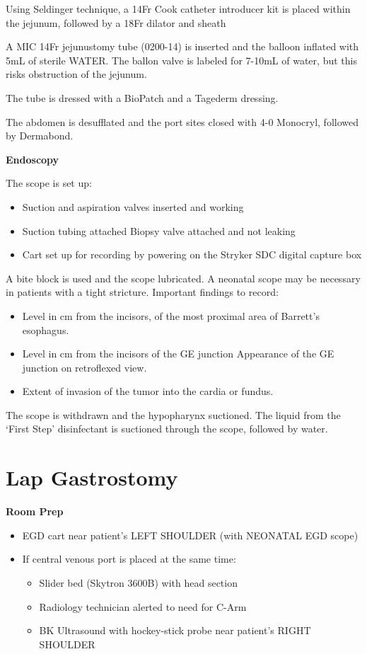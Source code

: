 \documentclass[
  letterpaper,
]{scrbook}
\providecommand{\tightlist}{%
  \setlength{\itemsep}{0pt}\setlength{\parskip}{0pt}}
\begin{document}
Using Seldinger technique, a 14Fr Cook catheter introducer kit is placed
within the jejunum, followed by a 18Fr dilator and sheath

A MIC 14Fr jejunustomy tube (0200-14) is inserted and the balloon
inflated with 5mL of sterile WATER. The ballon valve is labeled for
7-10mL of water, but this risks obstruction of the jejunum.

The tube is dressed with a BioPatch and a Tagederm dressing.

The abdomen is desufflated and the port sites closed with 4-0 Monocryl,
followed by Dermabond.

\textbf{Endoscopy}

The scope is set up:

\begin{itemize}
\tightlist
\item
  Suction and aspiration valves inserted and working
\item
  Suction tubing attached Biopsy valve attached and not leaking
\item
  Cart set up for recording by powering on the Stryker SDC digital
  capture box
\end{itemize}

A bite block is used and the scope lubricated. A neonatal scope may be
necessary in patients with a tight stricture. Important findings to
record:

\begin{itemize}
\tightlist
\item
  Level in cm from the incisors, of the most proximal area of Barrett's
  esophagus.
\item
  Level in cm from the incisors of the GE junction Appearance of the GE
  junction on retroflexed view.
\item
  Extent of invasion of the tumor into the cardia or fundus.
\end{itemize}

The scope is withdrawn and the hypopharynx suctioned. The liquid from
the `First Step' disinfectant is suctioned through the scope, followed
by water.

\chapter{Lap Gastrostomy}\label{lap_gastrostomy_salo}

\textbf{Room Prep}

\begin{itemize}
\tightlist
\item
  EGD cart near patient's LEFT SHOULDER (with NEONATAL EGD scope)
\item
  If central venous port is placed at the same time:

  \begin{itemize}
  \tightlist
  \item
    Slider bed (Skytron 3600B) with head section
  \item
    Radiology technician alerted to need for C-Arm
  \item
    BK Ultrasound with hockey-stick probe near patient's RIGHT SHOULDER
  \end{itemize}
\end{itemize}
\end{document}
